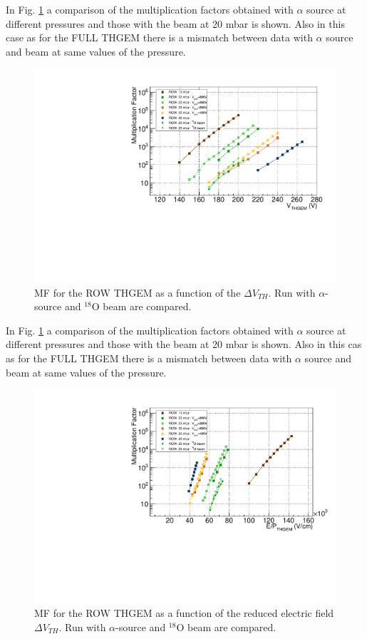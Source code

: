 \documentclass[a4paper, 11 pt]{report}
\newcommand{\Vthgem}{$\Delta V_{TH}$}
\begin{document}
  In Fig. \ref{fig:MF_ROW_beam} a comparison of the multiplication factors obtained with
  $\alpha$ source at different pressures and those with the beam at 20 mbar is shown. Also 
  in this case as for the FULL THGEM there is a mismatch between data with $\alpha$ source 
  and beam at same values of the pressure.
  
  \begin{figure}[htbp]
	\centering
	\includegraphics[width=\textwidth]{Immagini/MF_ROW_THGEM_withBeam.pdf}
	\caption{MF for the ROW THGEM as a function of the \Vthgem{}. Run with $\alpha$-source
	and $^{18}$O beam are compared. }
	\label{fig:MF_ROW_beam}
  \end{figure}
  In Fig. \ref{fig:MF_ROW_beam} a comparison of the multiplication factors obtained with
  $\alpha$ source at different pressures and those with the beam at 20 mbar is shown. Also in this
  cas as for the FULL THGEM there is a mismatch between data with $\alpha$ source and
  beam at same values of the pressure.
  \begin{figure}[htbp]
	\centering						  
	\includegraphics[width=\textwidth]{Immagini/MF_ROW_THGEM_withBeam_F.pdf}
	\caption{MF for the ROW THGEM as a function of the reduced electric field\Vthgem{}. Run with 
	$\alpha$-source	and $^{18}$O beam are compared. }
	\label{fig:MF_ALL_beam}
  \end{figure}
\end{document}
